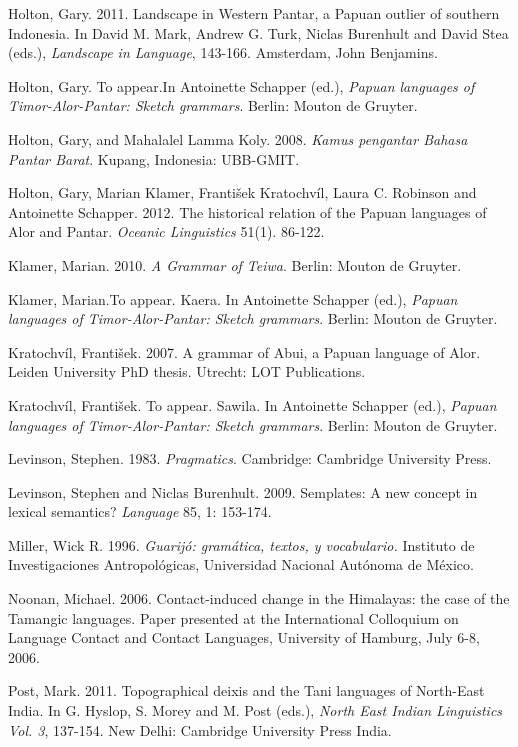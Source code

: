Holton, Gary. 2011. Landscape in Western Pantar, a Papuan outlier of southern Indonesia. In David M. Mark, Andrew G. Turk, Niclas Burenhult and David Stea (eds.), \textit{Landscape in Language}, 143-166. Amsterdam, John Benjamins.

Holton, Gary. To appear.In Antoinette Schapper (ed.), \textit{Papuan languages of Timor-Alor-Pantar: Sketch grammars}. Berlin: Mouton de Gruyter. 

Holton, Gary, and Mahalalel Lamma Koly. 2008. \textit{Kamus pengantar Bahasa Pantar Barat}. Kupang, Indonesia: UBB-GMIT.

Holton, Gary, Marian Klamer, Franti\v{s}ek Kratochv\'il, Laura C. Robinson and Antoinette Schapper. 2012. The historical relation of the Papuan languages of Alor and Pantar. \textit{Oceanic Linguistics }51(1). 86-122.

Klamer, Marian. 2010. \textit{A Grammar of Teiwa}. Berlin: Mouton de Gruyter.

Klamer, Marian.To appear. Kaera. In Antoinette Schapper (ed.), \textit{Papuan languages of Timor-Alor-Pantar: Sketch grammars}. Berlin: Mouton de Gruyter. 

Kratochv\'il, Franti\v{s}ek. 2007. A grammar of Abui, a Papuan language of Alor. Leiden University PhD thesis. Utrecht: LOT Publications.

Kratochv\'il, Franti\v{s}ek. To appear. Sawila. In Antoinette Schapper (ed.), \textit{Papuan languages of Timor-Alor-Pantar: Sketch grammars}. Berlin: Mouton de Gruyter.

Levinson, Stephen. 1983. \textit{Pragmatics}. Cambridge: Cambridge University Press.

Levinson, Stephen and Niclas Burenhult. 2009. Semplates: A new concept in lexical semantics? \textit{Language} 85, 1: 153-174.

Miller, Wick R. 1996. \textit{Guarij\'o: gram\'atica, textos, y vocabulario.} Instituto de Investigaciones Antropol\'ogicas, Universidad Nacional Aut\'onoma de M\'exico.

Noonan, Michael. 2006. Contact-induced change in the Himalayas: the case of the Tamangic languages. Paper presented at the International Colloquium on Language Contact and Contact Languages, University of Hamburg, July 6-8, 2006.

Post, Mark. 2011. Topographical deixis and the Tani languages of North-East India. In G. Hyslop, S. Morey and M. Post (eds.), \textit{North East Indian Linguistics Vol. 3}, 137-154. New Delhi: Cambridge University Press India.

